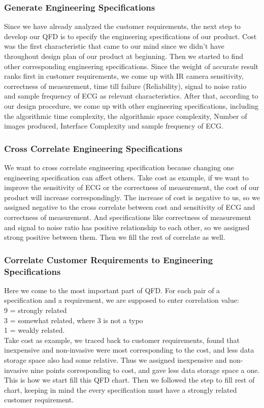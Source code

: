 \documentclass[paper=letter, fontsize=11pt]{scrartcl}
\numberwithin{equation}{section}		%
\numberwithin{figure}{section}			%
\numberwithin{table}{section}			%
\begin{document}
\subsubsection{Generate Engineering Specifications}
Since we have already analyzed the customer requirements, the next step to develop our QFD is to specify the engineering specifications of our product. Cost was the first characteristic that came to our mind since we didn't have throughout design plan of our product at beginning.  Then we started to find other corresponding engineering specifications. Since the weight of accurate result ranks first in customer requirements, we come up with IR camera sensitivity, correctness of measurement, time till failure (Reliability), signal to noise ratio and sample frequency of ECG as relevant characteristics. After that, according to our design procedure, we come up with other engineering specifications, including the algorithmic time complexity, the algorithmic space complexity, Number of images produced, Interface Complexity and sample frequency of ECG.

\subsubsection{Cross Correlate Engineering Specifications}
We want to cross correlate engineering specification because changing one engineering specification can affect others. Take cost as example, if we want to improve the sensitivity of ECG or the correctness of measurement, the cost of our product will increase correspondingly. The increase of cost is negative to us, so we assigned negative to the cross correlate between cost and sensitivity of ECG and correctness of measurement. And specifications like correctness of measurement and signal to noise ratio has positive relationship to each other, so we assigned strong positive between them. Then we fill the rest of correlate as well.

\subsubsection{Correlate Customer Requirements to Engineering Specifications}
Here we come to the most important part of QFD. For each pair of a specification and a requirement, we are supposed to enter correlation value\cite{450}: \\
9 = strongly related \\
3 = somewhat related, where 3 is not a typo \\
1 = weakly related. \\
Take cost as example, we traced back to customer requirements, found that inexpensive and non-invasive were most corresponding to the cost, and less data storage space also had some relative. Thus we assigned inexpensive and non-invasive nine points corresponding to cost, and gave less data storage space a one. This is how we start fill this QFD chart. Then we followed the step to fill rest of chart, keeping in mind the every specification must have a strongly related customer requirement.
\end{document}
